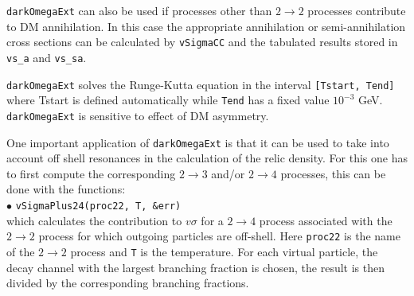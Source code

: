 \documentclass[12pt,a4paper]{article}
\begin{document}
 {\tt darkOmegaExt}   can also be used 
if  processes other than $ 2 \to 2$ processes contribute  to DM  annihilation. In this case the appropriate annihilation or  semi-annihilation
cross sections can be calculated by {\tt vSigmaCC} and the tabulated results stored in \verb|vs_a| and \verb|vs_sa|. 

 {\tt darkOmegaExt} solves  the Runge-Kutta equation in the interval {\tt [Tstart, Tend]} 
 where Tstart is defined automatically while {\tt Tend} has a fixed
value $10^{-3}$ GeV. {\tt darkOmegaExt} is sensitive to effect of DM
asymmetry.


One important application of   {\tt darkOmegaExt} is that it can be used to take into account off shell resonances in the calculation of the relic density.
For this one has to first compute the corresponding $2\to 3$ and/or $2\to 4$ processes, this can be done with the functions:\\

\noindent
$\bullet$ \verb|vSigmaPlus24(proc22, T, &err)|\\
which calculates the contribution to $v\sigma$ for a $2\to 4$ process  associated with the  $2\to2$ process  for which outgoing particles are off-shell. 
Here {\tt proc22} is the name of the $2\to2$ process and {\tt T} is the temperature.
For each virtual particle, the decay channel with the largest branching fraction is chosen, the result is then divided by the corresponding branching fractions.
\end{document}
